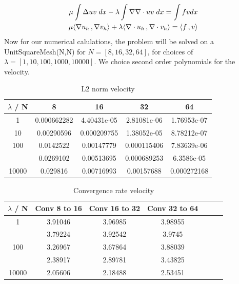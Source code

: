 \documentclass[a4paper,norsk]{article}
\begin{document}
\begin{align*}
\mu \int \Delta u v \hspace{1mm} dx - \lambda \int \nabla \nabla \cdot u v \hspace{1mm} dx = \int f v dx\\ 
\mu \langle \nabla u_h \,, \nabla v_h \rangle + \lambda \langle \nabla \cdot u_h \,, \nabla \cdot v_h \rangle 
= \langle f \,, v \rangle
\end{align*}
Now for our numerical calulations, the problem will be solved on a UnitSquareMesh(N,N) for $N = [8, 16, 32, 64]$, for 
choices of $\lambda = [1, 10, 100, 1000, 10000]$. We choice second order polynomials for the velocity.  


\begin{table}[ht]
\caption {L2 norm velocity} 
\centering
\begin{tabular}{c|cccc}
\hline
\rowcolor{LightCyan}
$\lambda$ / N  & 8 & 16 & 32 & 64\\
\hline
 1     & 0.000662282 & 4.40431e-05 & 2.81081e-06 & 1.76953e-07 \\ \hline 
 \rowcolor{LightCyan} 
10    & 0.00290596  & 0.000209755 & 1.38052e-05 & 8.78212e-07 \\ \hline
100   & 0.0142522   & 0.00147779  & 0.000115406 & 7.83639e-06 \\ \hline
\rowcolor{LightCyan} \hline
1000  & 0.0269102   & 0.00513695  & 0.000689253 & 6.3586e-05  \\ \hline
10000 & 0.029816    & 0.00716993  & 0.00157688  & 0.000272168 \\
\hline
\end{tabular}
\end{table}

\begin{table}[ht]
\caption {Convergence rate velocity} 
\centering
\begin{tabular}{c|cccccc}
\hline
\rowcolor{LightCyan}
$\lambda$ / N  & Conv 8 to 16  &  Conv 16 to 32 &  Conv 32 to 64\\
\hline
1     & 3.91046 & 3.96985 & 3.98955 &  \\ \hline
\rowcolor{LightCyan} \hline
10    & 3.79224 & 3.92542 & 3.9745  &  \\ \hline
100   & 3.26967 & 3.67864 & 3.88039 &  \\ \hline
\rowcolor{LightCyan} \hline
1000  & 2.38917 & 2.89781 & 3.43825 &  \\ \hline
10000 & 2.05606 & 2.18488 & 2.53451 & \\
\hline
\end{tabular}
\end{table}
 
\end{document}
